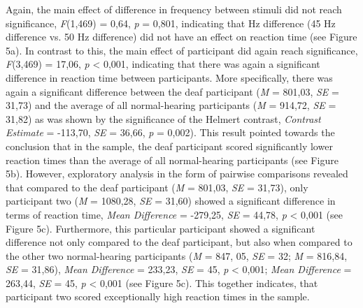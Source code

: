 \documentclass[12pt]{article}
\begin{document}
%
\par Again, the main effect of difference in frequency between stimuli did not reach significance, \textit{F}(1,469) = 0,64, \textit{p} = 0,801, indicating that Hz difference (45 Hz difference vs. 50 Hz difference) did not have an effect on reaction time (see Figure 5a). In contrast to this, the main effect of participant did again reach significance, \textit{F}(3,469) = 17,06, \textit{p} < 0,001, indicating that there was again a significant difference in reaction time between participants. More specifically, there was again a significant difference between the deaf participant (\textit{M} = 801,03, \textit{SE} = 31,73) and the average of all normal-hearing participants (\textit{M} = 914,72, \textit{SE} = 31,82) as was shown by the significance of the Helmert contrast, \textit{Contrast Estimate} = -113,70, \textit{SE} = 36,66, \textit{p} = 0,002). This result pointed towards the conclusion that in the sample, the deaf participant scored significantly lower reaction times than the average of all normal-hearing participants (see Figure 5b). However, exploratory analysis in the form of pairwise comparisons revealed that compared to the deaf participant (\textit{M} = 801,03, \textit{SE} = 31,73), only participant two (\textit{M} = 1080,28, \textit{SE} = 31,60) showed a significant difference in terms of reaction time, \textit{Mean Difference} = -279,25, \textit{SE} = 44,78, \textit{p} < 0,001 (see Figure 5c). Furthermore, this particular participant showed a significant difference not only compared to the deaf participant, but also when compared to the other two normal-hearing participants (\textit{M} = 847, 05, \textit{SE} = 32; \textit{M} = 816,84, \textit{SE} = 31,86), \textit{Mean Difference} = 233,23, \textit{SE} = 45, \textit{p} < 0,001; \textit{Mean Difference} = 263,44, \textit{SE} = 45, \textit{p} < 0,001 (see Figure 5c). This together indicates, that participant two scored exceptionally high reaction times in the sample.
\end{document}

